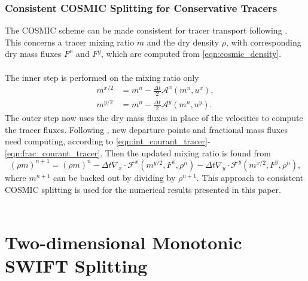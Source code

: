\documentclass[11pt,a4paper]{article}
\begin{document}
\subsubsection{Consistent COSMIC Splitting for Conservative Tracers} \label{sec:cosmic_tracer}
The COSMIC scheme can be made consistent for tracer transport following \cite{lin1996ffsl}.
This concerns a tracer mixing ratio $m$ and the dry density $\rho$, with corresponding dry mass fluxes $F^x$ and $F^y$, which are computed from \eqref{eqn:cosmic_density}. \\ 
\\
The inner step is performed on the mixing ratio only
\begin{subequations}
\begin{align}
    m^{x/2} &= m^n - \frac{\Delta{t}}{2} \mathcal{A}^x(m^n, u^x), \\
    m^{y/2} &= m^n - \frac{\Delta{t}}{2} \mathcal{A}^y(m^n, u^y).
\end{align}
\end{subequations}
The outer step now uses the dry mass fluxes in place of the velocities to compute the tracer fluxes.
Following \citet{skamarock2006limiters}, new departure points and fractional mass fluxes need computing, according to \eqref{eqn:int_courant_tracer}-\eqref{eqn:frac_courant_tracer}.
Then the updated mixing ratio is found from
\begin{equation} \label{eqn:cosmic_tracer_end}
   (\rho m)^{n+1} = (\rho m)^{n} - \Delta{t} \nabla_x\cdot \mathcal{F}^x(m^{y/2},F^x,\rho^n) - \Delta{t} \nabla_y\cdot \mathcal{F}^y(m^{x/2},F^y,\rho^n),
\end{equation}
where $m^{n+1}$ can be backed out by dividing by $\rho^{n+1}$. This approach to consistent COSMIC splitting is used for the numerical results presented in this paper. \\
\\


\section{Two-dimensional Monotonic SWIFT Splitting} \label{sec:swift_splitting} 
\end{document}
